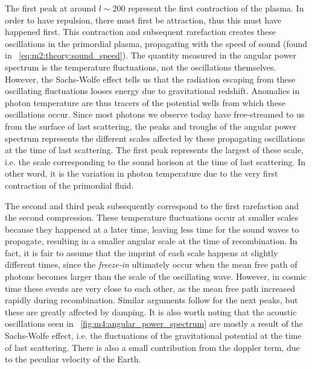         The first peak at around $l\sim200$ represent the first contraction of the plasma. In order to have repulsion, there must first be attraction, thus this must have happened first. This contraction and subsequent rarefaction creates these oscillations in the primordial plasma, propagating with the speed of sound (found in ~\cref{eq:m2:theory:sound_speed}). The quantity measured in the angular power spectrum is the temperature fluctuations, not the oscillations themselves. However, the Sachs-Wolfe effect tells us that the radiation escaping from these oscillating fluctuations looses energy due to gravitational redshift. Anomalies in photon temperature are thus tracers of the potential wells from which these oscillations occur. Since most photons we observe today have free-streamed to us from the surface of last scattering, the peaks and troughs of the angular power spectrum represents the different scales affected by these propagating oscillations at the time of last scattering. The first peak represents the largest of these scale, i.e. the scale corresponding to the sound horison at the time of last scattering. In other word, it is the variation in photon temperature due to the very first contraction of the primordial fluid. 

        The second and third peak subsequently correspond to the first rarefaction and the second compression. These temperature fluctuations occur at smaller scales because they happened at a later time, leaving less time for the sound waves to propagate, resulting in a smaller angular scale at the time of recombination. In fact, it is fair to assume that the imprint of each scale happens at slightly different times, since the \textit{freeze-in} ultimately occur when the mean free path of photons becomes larger than the scale of the oscillating wave. However, in cosmic time these events are very close to each other, as the mean free path increased rapidly during recombination. Similar arguments follow for the next peaks, but these are greatly affected by damping. It is also worth noting that the acoustic oscillations seen in ~\cref{fig:m4:angular_power_spectrum} are mostly a result of the Sachs-Wolfe effect, i.e. the fluctuations of the gravitational potential at the time of last scattering. There is also a small contribution from the doppler term, due to the peculiar velocity of the Earth. 

